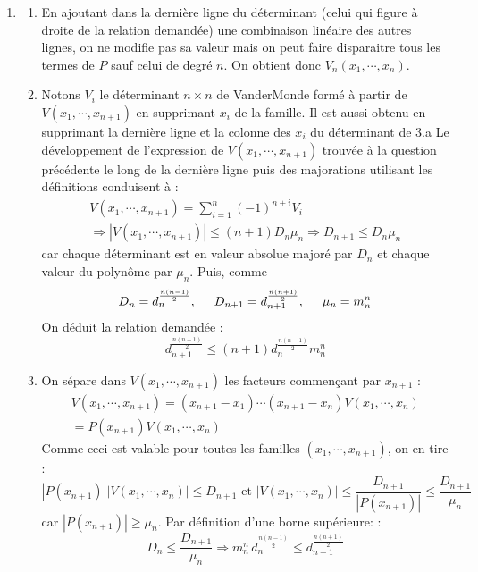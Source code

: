\begin{enumerate}
\item 
\begin{enumerate}
 \item En ajoutant dans la dernière ligne du déterminant (celui qui figure à droite de la relation demandée) une combinaison linéaire des autres lignes, on ne modifie pas sa valeur mais on peut faire disparaitre tous les termes de $P$ sauf celui de degré $n$. On obtient donc $V_n(x_1,\cdots,x_n)$.
\item Notons $V_i$ le déterminant $n\times n$ de VanderMonde formé à partir de $V(x_1,\cdots,x_{n+1})$ en supprimant $x_i$ de la famille. Il est aussi obtenu en supprimant la dernière ligne et la colonne des $x_i$ du déterminant de 3.a Le développement de l'expression de $V(x_1,\cdots,x_{n+1})$ trouvée à la question précédente le long de la dernière ligne puis des majorations utilisant les définitions conduisent à :
\begin{multline*}
 V(x_1,\cdots,x_{n+1}) = \sum_{i=1}^{n} (-1)^{n+i}V_i \\
 \Rightarrow
|V(x_1,\cdots,x_{n+1})| \leq (n+1) D_n \mu_n \Rightarrow
D_{n+1} \leq D_n \mu_n
\end{multline*}
car chaque déterminant est en valeur absolue majoré par $D_n$ et chaque valeur du polynôme par $\mu_n$. Puis, comme 
\begin{displaymath}
 D_n = d_n^{\frac{n(n-1)}{2}}, \hspace{0.5cm}  D_{n+1} = d_{n+1}^{\frac{n(n+1)}{2}}, \hspace{0.5cm} \mu_n = m_n^n
\end{displaymath}
On déduit la relation demandée :
\begin{displaymath}
 d_{n+1}^{\frac{n(n+1)}{2}} \leq (n+1)d_n^{\frac{n(n-1)}{2}}m_n^n
\end{displaymath}
\item On sépare dans $V(x_1,\cdots,x_{n+1})$ les facteurs commençant par $x_{n+1}$ :
\begin{multline*}
 V(x_1,\cdots,x_{n+1})=(x_{n+1}-x_1)\cdots(x_{n+1}-x_n)V(x_1,\cdots,x_n)\\
=P(x_{n+1})V(x_1,\cdots,x_n)
\end{multline*}
Comme ceci est valable pour toutes les familles $(x_1,\cdots,x_{n+1})$, on en tire :
\begin{displaymath}
 |P(x_{n+1})||V(x_1,\cdots,x_n)| \leq D_{n+1} \text{ et }
 |V(x_1,\cdots,x_n)| \leq \frac{D_{n+1}}{ |P(x_{n+1})|}
\leq \frac{D_{n+1}}{ \mu_n}
\end{displaymath}
car $|P(x_{n+1})|\geq \mu_n$. Par définition d'une borne supérieure: :
\begin{displaymath}
 D_n \leq \frac{D_{n+1}}{ \mu_n} 
 \Rightarrow
 m_n^n\, d_n^{\frac{n(n-1)}{2}} \leq d_{n+1}^{\frac{n(n+1)}{2}}
\end{displaymath}


\end{enumerate}
\end{enumerate}
